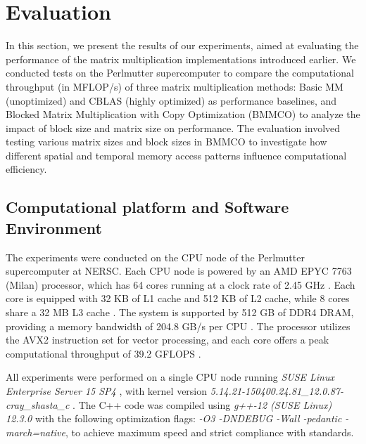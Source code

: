 \section{Evaluation}

In this section, we present the results of our experiments, aimed at evaluating the performance of the matrix multiplication implementations introduced earlier. We conducted tests on the Perlmutter supercomputer to compare the computational throughput (in MFLOP/s) of three matrix multiplication methods: Basic MM (unoptimized) and CBLAS (highly optimized) as performance baselines, and Blocked Matrix Multiplication with Copy Optimization (BMMCO) to analyze the impact of block size and matrix size on performance. The evaluation involved testing various matrix sizes and block sizes in BMMCO to investigate how different spatial and temporal memory access patterns influence computational efficiency.

\subsection{Computational platform and Software Environment}
\label{sec:computeational-platform-and-software-environment}
The experiments were conducted on the CPU node of the Perlmutter supercomputer at NERSC. Each CPU node is powered by an AMD EPYC 7763 (Milan) processor, which has 64 cores running at a clock rate of 2.45 GHz \cite{nersc_perlmutter_architecture}. Each core is equipped with 32 KB of L1 cache and 512 KB of L2 cache, while 8 cores share a 32 MB L3 cache \cite{amd_epyc_tuning_guide}. The system is supported by 512 GB of DDR4 DRAM, providing a memory bandwidth of 204.8 GB/s per CPU \cite{nersc_perlmutter_architecture}. The processor utilizes the AVX2 instruction set for vector processing, and each core offers a peak computational throughput of 39.2 GFLOPS \cite{nersc_perlmutter_architecture}.

All experiments were performed on a single CPU node running \textit{SUSE Linux Enterprise Server 15 SP4} \cite{usami2024hostnamectl}, with kernel version \textit{5.14.21-150400.24.81\_12.0.87-cray\_shasta\_c} \cite{usami2024hostnamectl}. The C++ code was compiled using \textit{g++-12 (SUSE Linux) 12.3.0} with the following optimization flags: \textit{-O3 -DNDEBUG -Wall -pedantic -march=native}, to achieve maximum speed and strict compliance with standards.

